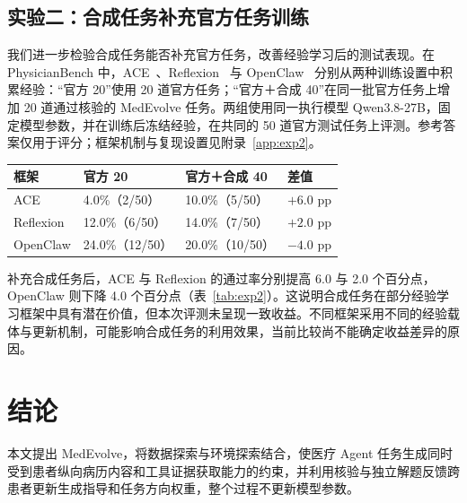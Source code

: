 \subsection{实验二：合成任务补充官方任务训练}

我们进一步检验合成任务能否补充官方任务，改善经验学习后的测试表现。在 PhysicianBench 中，ACE~\citep{zhang2026ace}、Reflexion~\citep{shinn2023reflexion} 与 OpenClaw~\citep{openclaw2026} 分别从两种训练设置中积累经验：“官方 20”使用 20 道官方任务；“官方＋合成 40”在同一批官方任务上增加 20 道通过核验的 MedEvolve 任务。两组使用同一执行模型 Qwen3.8-27B，固定模型参数，并在训练后冻结经验，在共同的 50 道官方测试任务上评测。参考答案仅用于评分；框架机制与复现设置见附录~\ref{app:exp2}。

\par\medskip\noindent
\begin{minipage}{\columnwidth}
\centering
\small
{}
\label{tab:exp2}
\setlength{\tabcolsep}{3pt}
\begin{tabularx}{\columnwidth}{lYYY}
\toprule
框架 & 官方 20 & 官方＋合成 40 & 差值 \\
\midrule
ACE & 4.0\%（2/50） & 10.0\%（5/50） & $+6.0$ pp \\
Reflexion & 12.0\%（6/50） & 14.0\%（7/50） & $+2.0$ pp \\
OpenClaw & 24.0\%（12/50） & 20.0\%（10/50） & $-4.0$ pp \\
\bottomrule
\end{tabularx}
\end{minipage}
\par\medskip

补充合成任务后，ACE 与 Reflexion 的通过率分别提高 6.0 与 2.0 个百分点，OpenClaw 则下降 4.0 个百分点（表~\ref{tab:exp2}）。这说明合成任务在部分经验学习框架中具有潜在价值，但本次评测未呈现一致收益。不同框架采用不同的经验载体与更新机制，可能影响合成任务的利用效果，当前比较尚不能确定收益差异的原因。

\raggedbottom

\section{结论}

本文提出 MedEvolve，将数据探索与环境探索结合，使医疗 Agent 任务生成同时受到患者纵向病历内容和工具证据获取能力的约束，并利用核验与独立解题反馈跨患者更新生成指导和任务方向权重，整个过程不更新模型参数。

